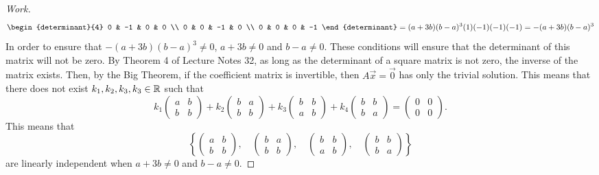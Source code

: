 \documentclass{article}
\begin{document}
\begin{proof}[Work]
\begin{align*}
\begin{determinant}{4}
                             0 & -1 & 0 & 0 \\
                             0 & 0 & -1 & 0 \\
                             0 & 0 & 0 & -1
                         \end{determinant} =
        (a+3b)(b-a)^3(1)(-1)(-1)(-1) = -(a+3b)(b-a)^3
    \end{align*}
    In order to ensure that $-(a+3b)(b-a)^3 \neq 0$, $a+3b \neq 0$ and $b-a \neq 0$. These conditions will ensure that the determinant of this matrix will not be zero. By Theorem 4 of Lecture Notes 32, as long as the determinant of a square matrix is not zero, the inverse of the matrix exists. Then, by the Big Theorem, if the coefficient matrix is invertible, then $A\vec{x} = \vec{0}$ has only the trivial solution. This means that there does not exist $k_1, k_2, k_3, k_3 \in \mathbb{R}$ such that
    \[
        k_1\begin{pmatrix}
            a & b \\
            b & b
        \end{pmatrix} + k_2 \begin{pmatrix}
            b & a \\
            b & b
        \end{pmatrix} + k_3 \begin{pmatrix}
            b & b \\
            a & b
        \end{pmatrix} + k_4\begin{pmatrix}
            b & b \\
            b & a
        \end{pmatrix} = \begin{pmatrix}
            0 & 0 \\
            0 & 0
        \end{pmatrix}.
    \]
    This means that
    \[
        \left\{ \begin{pmatrix}
            a & b \\
            b & b
        \end{pmatrix}, \quad \begin{pmatrix}
            b & a \\
            b & b
        \end{pmatrix}, \quad \begin{pmatrix}
            b & b \\
            a & b
        \end{pmatrix}, \quad \begin{pmatrix}
            b & b \\
            b & a
        \end{pmatrix}\right\}
    \]
    are linearly independent when $a+3b \neq 0$ and $b-a \neq 0$.
\end{proof}
\qdash
\end{document}
